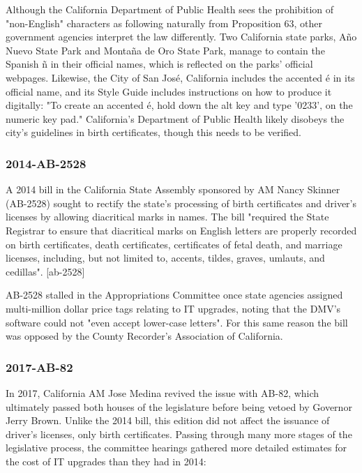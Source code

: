Although the California Department of Public Health sees the prohibition of
"non-English" characters as following naturally from Proposition 63, other
government agencies interpret the law differently. Two California state parks,
Año Nuevo State Park and Montaña de Oro State Park, manage to contain the
Spanish ñ in their official names, which is reflected on the parks' official
webpages. \parencite{año-nuevo} \parencite{montaña-de-oro} Likewise, the City of
San José, California includes the accented é in its official name, and its Style
Guide includes instructions on how to produce it digitally: "To create an
accented é, hold down the alt key and type '0233'‚ on the numeric key pad."
\textcite{san-josé} California's Department of Public Health likely disobeys the
city's guidelines in birth certificates, though this needs to be verified.

\subsubsection{2014-AB-2528}

A 2014 bill in the California State Assembly sponsored by AM Nancy Skinner
(AB-2528) sought to rectify the state's processing of birth certificates and
driver's licenses by allowing diacritical marks in names. The bill "required the
State Registrar to ensure that diacritical marks on English letters are properly
recorded on birth certificates, death certificates, certificates of fetal death,
and marriage licenses, including, but not limited to, accents, tildes, graves,
umlauts, and cedillas". [ab-2528]

AB-2528 stalled in the Appropriations Committee once state agencies assigned
multi-million dollar price tags relating to IT upgrades, noting that the DMV's
software could not "even accept lower-case letters". For this same reason the
bill was opposed by the County Recorder's Association of California.

\subsubsection{2017-AB-82}

In 2017, California AM Jose Medina revived the issue with AB-82, which
ultimately passed both houses of the legislature before being vetoed by Governor
Jerry Brown. Unlike the 2014 bill, this edition did not affect the issuance of
driver's licenses, only birth certificates. Passing through many more stages of
the legislative process, the committee hearings gathered more detailed estimates
for the cost of IT upgrades than they had in 2014:

